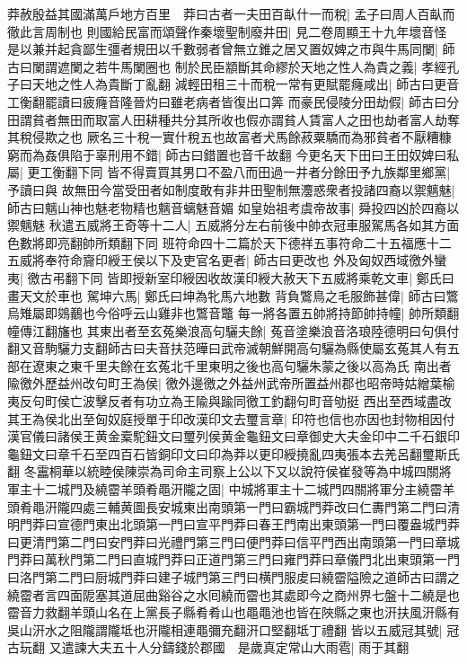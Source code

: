 莽赦殷益其國滿萬戶地方百里　莽曰古者一夫田百畒什一而稅|{
	孟子曰周人百畒而徹此言周制也}
則國給民富而頌聲作秦壞聖制廢井田|{
	見二卷周顯王十九年壞音怪}
是以兼并起貪鄙生彊者規田以千數弱者曾無立錐之居又置奴婢之市與牛馬同闌|{
	師古曰闌謂遮闌之若牛馬闌圈也}
制於民臣顓斷其命繆於天地之性人為貴之義|{
	孝經孔子曰天地之性人為貴斷丁亂翻}
減輕田租三十而稅一常有更賦罷癃咸出|{
	師古曰更音工衡翻罷讀曰疲癃音隆晉灼曰雖老病者皆復出口筭}
而豪民侵陵分田劫假|{
	師古曰分田謂貧者無田而取富人田耕種共分其所收也假亦謂貧人賃富人之田也劫者富人劫奪其稅侵欺之也}
厥名三十稅一實什稅五也故富者犬馬餘菽粟驕而為邪貧者不厭糟糠窮而為姦俱陷于辜刑用不錯|{
	師古曰錯置也音千故翻}
今更名天下田曰王田奴婢曰私屬|{
	更工衡翻下同}
皆不得賣買其男口不盈八而田過一井者分餘田予九族鄰里鄉黨|{
	予讀曰與}
故無田今當受田者如制度敢有非井田聖制無灋惑衆者投諸四裔以禦魑魅|{
	師古曰魑山神也魅老物精也魑音螭魅音媚}
如皇始祖考虞帝故事|{
	舜投四凶於四裔以禦魑魅}
秋遣五威將王奇等十二人|{
	五威將分左右前後中帥衣冠車服駕馬各如其方面色數將即亮翻帥所類翻下同}
班符命四十二篇於天下德祥五事符命二十五福應十二五威將奉符命齎印綬王侯以下及吏官名更者|{
	師古曰更改也}
外及匈奴西域徼外蠻夷|{
	徼古弔翻下同}
皆即授新室印綬因收故漢印綬大赦天下五威將乘乾文車|{
	鄭氏曰畫天文於車也}
駕坤六馬|{
	鄭氏曰坤為牝馬六地數}
背負鷩鳥之毛服飾甚偉|{
	師古曰鷩烏雉屬即鵕䴊也今俗呼云山雞非也鷩音鼈}
每一將各置五帥將持節帥持幢|{
	帥所類翻幢傳江翻旛也}
其東出者至玄菟樂浪高句驪夫餘|{
	菟音塗樂浪音洛琅陸德明曰句俱付翻又音駒驪力支翻師古曰夫音扶范曄曰武帝滅朝鮮開高句驪為縣使屬玄菟其人有五部在遼東之東千里夫餘在玄菟北千里東明之後也高句驪朱蒙之後以高為氏}
南出者隃徼外歷益州改句町王為侯|{
	徼外邊徼之外益州武帝所置益州郡也昭帝時姑繒葉榆夷反句町侯亡波擊反者有功立為王隃與踰同徼工釣翻句町音劬挺}
西出至西域盡改其王為侯北出至匈奴庭授單于印改漢印文去璽言章|{
	印符也信也亦因也封物相因付漢官儀曰諸侯王黄金槖駝鈕文曰璽列侯黄金龜鈕文曰章御史大夫金印中二千石銀印龜鈕文曰章千石至四百石皆銅印文曰印為莽以更印綬撓亂四夷張本去羌呂翻璽斯氏翻}
冬靁桐華以統睦侯陳崇為司命主司察上公以下又以說符侯崔發等為中城四關將軍主十二城門及繞霤羊頭肴黽汧隴之固|{
	中城將軍主十二城門四關將軍分主繞霤羊頭肴黽汧隴四處三輔黄圖長安城東出南頭第一門曰霸城門莽改曰仁夀門第二門曰清明門莽曰宣德門東出北頭第一門曰宣平門莽曰春王門南出東頭第一門曰覆盎城門莽曰更清門第二門曰安門莽曰光禮門第三門曰便門莽曰信平門西出南頭第一門曰章城門莽曰萬秋門第二門曰直城門莽曰正道門第三門曰雍門莽曰章儀門北出東頭第一門曰洛門第二門曰厨城門莽曰建子城門第三門曰横門服䖍曰繞霤隘險之道師古曰謂之繞霤者言四面阸塞其道屈曲谿谷之水囘繞而霤也其處即今之商州界七盤十二繞是也霤音力救翻羊頭山名在上黨長子縣肴肴山也黽黽池也皆在陜縣之東也汧扶風汧縣有吳山汧水之阻隴謂隴坻也汧隴相連黽彌充翻汧口堅翻坻丁禮翻}
皆以五威冠其號|{
	冠古玩翻}
又遣諫大夫五十人分鑄錢於郡國　是歲真定常山大雨雹|{
	雨于其翻}


